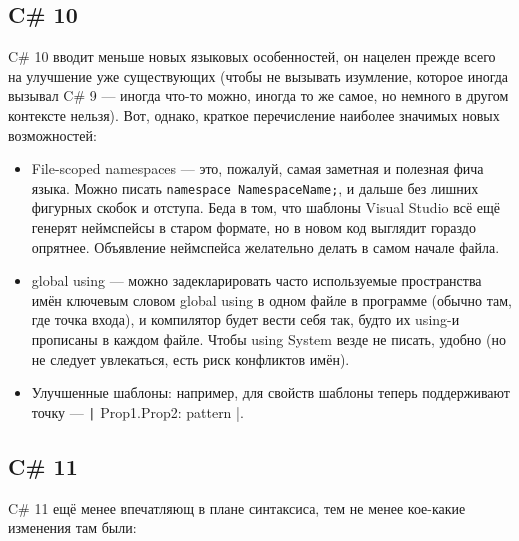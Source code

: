 \documentclass{../../text-style}
\begin{document}
\subsection{C\# 10}

C\# 10 вводит меньше новых языковых особенностей, он нацелен прежде всего на улучшение уже существующих (чтобы не вызывать изумление, которое иногда вызывал C\# 9 --- иногда что-то можно, иногда то же самое, но немного в другом контексте нельзя). Вот, однако, краткое перечисление наиболее значимых новых возможностей:

\begin{itemize}
    \item File-scoped namespaces --- это, пожалуй, самая заметная и полезная фича языка. Можно писать \texttt{namespace NamespaceName;}, и дальше без лишних фигурных скобок и отступа. Беда в том, что шаблоны Visual Studio всё ещё генерят неймспейсы в старом формате, но в новом код выглядит гораздо опрятнее. Объявление неймспейса желательно делать в самом начале файла.
    \item global using --- можно задекларировать часто используемые пространства имён ключевым словом global using в одном файле в программе (обычно там, где точка входа), и компилятор будет вести себя так, будто их using-и прописаны в каждом файле. Чтобы using System везде не писать, удобно (но не следует увлекаться, есть риск конфликтов имён).
    \item Улучшенные шаблоны: например, для свойств шаблоны теперь поддерживают точку --- \texttt|{ Prop1.Prop2: pattern }|.
\end{itemize}

\subsection{C\# 11}

C\# 11 ещё менее впечатляющ в плане синтаксиса, тем не менее кое-какие изменения там были:
\end{document}
